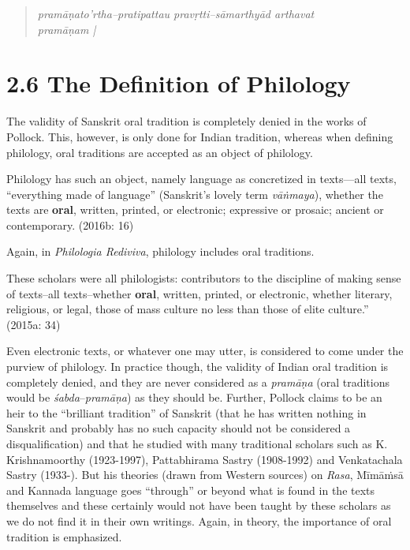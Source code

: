 \vspace{-.3cm}

\begin{verse}
\textit{pramāṇato'rtha–pratipattau pravṛtti–sāmarthyād arthavat\\ pramāṇam |}
\end{verse}

\vspace{-.3cm}

\section*{2.6 The Definition of Philology}

\vspace{-.2cm}

The validity of Sanskrit oral tradition is completely denied in the works of Pollock. This, however, is only done for Indian tradition, whereas when defining philology, oral traditions are accepted as an object of philology.

\begin{myquote}
Philology has such an object, namely language as concretized in texts—all texts, “everything made of language” (Sanskrit’s lovely term \textit{vāṅmaya}), whether the texts are \textbf{oral}, written, printed, or electronic; expressive or prosaic; ancient or contemporary. (2016b: 16)
\end{myquote}

Again, in \textit{Philologia Rediviva}, philology includes oral traditions.

\begin{myquote}
These scholars were all philologists: contributors to the discipline of making sense of texts–all texts–whether \textbf{oral}, written, printed, or electronic, whether literary, religious, or legal, those of mass culture no less than those of elite culture.” (2015a: 34)
\end{myquote}

Even electronic texts, or whatever one may utter, is considered to come under the purview of philology. In practice though, the validity of Indian oral tradition is completely denied, and they are never considered as a \textit{pramāṇa} (oral traditions would be \textit{śabda}–\textit{pramāṇa}) as they should be. Further, Pollock claims to be an heir to the “brilliant tradition” of Sanskrit (that he has written nothing in Sanskrit and probably has no such capacity should not be considered a disqualification) and that he studied with many traditional scholars such as K. Krishnamoorthy (1923-1997), Pattabhirama Sastry (1908-1992) and Venkatachala Sastry (1933-). But his theories (drawn from Western sources) on \textit{Rasa}, Mīmāṁsā and Kannada language goes “through” or beyond what is found in the texts themselves and these certainly would not have been taught by these scholars as we do not find it in their own writings. Again, in theory, the importance of oral tradition is emphasized.

